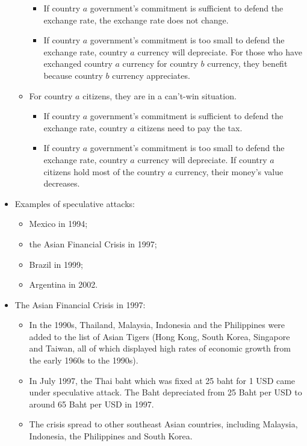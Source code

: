 \documentclass[a4paper,twoside]{article}
\newif\IfInSansMode
\numberwithin{equation}{section}
\numberwithin{figure}{section}
\begin{document}
\begin{itemize}
\begin{itemize}
			\begin{itemize}
				\item If country \( a \) government's commitment is sufficient to defend the exchange rate, the exchange rate does not change.
				\item If country \( a \) government's commitment is too small to defend the exchange rate, country \( a \) currency will depreciate. For those who have exchanged country \( a \) currency for country \( b \) currency, they benefit because country \( b \) currency appreciates.
			\end{itemize}
			\item For country \( a \) citizens, they are in a can't-win situation.
			\begin{itemize}
				\item If country \( a \) government's commitment is sufficient to defend the exchange rate, country \( a \) citizens need to pay the tax.
				\item If country \( a \) government's commitment is too small to defend the exchange rate, country \( a \) currency will depreciate. If country \( a \) citizens hold most of the country \( a \) currency, their money's value decreases.
			\end{itemize}
		\end{itemize}
		\item Examples of speculative attacks:
		\begin{itemize}
			\item Mexico in 1994;
			\item the Asian Financial Crisis in 1997;
			\item Brazil in 1999;
			\item Argentina in 2002.
		\end{itemize}
		\item The Asian Financial Crisis in 1997:
		\begin{itemize}
			\item In the 1990s, Thailand, Malaysia, Indonesia and the Philippines were added to the list of Asian Tigers (Hong Kong, South Korea, Singapore and Taiwan, all of which displayed high rates of economic growth from the early 1960s to the 1990s).
			\item In July 1997, the Thai baht which was fixed at 25 baht for 1 USD came under speculative attack. The Baht depreciated from 25 Baht per USD to around 65 Baht per USD in 1997.
			\item The crisis spread to other southeast Asian countries, including Malaysia, Indonesia, the Philippines and South Korea.

\end{itemize}
\end{itemize}
\end{document}
